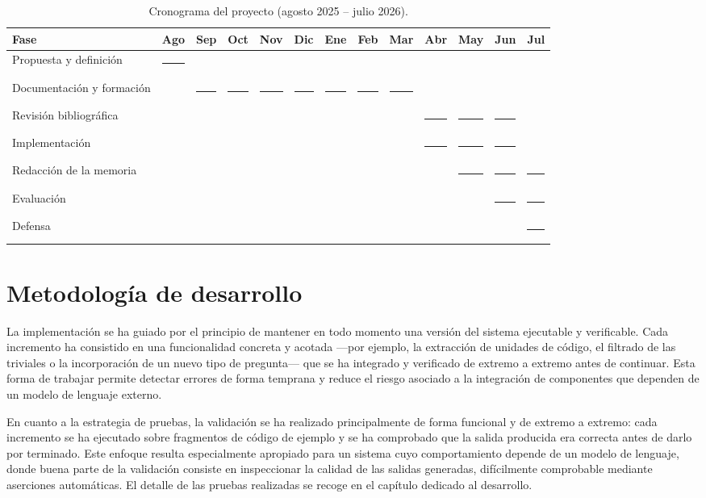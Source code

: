 \begin{table}[htbp]
  \centering
  \caption{Cronograma del proyecto (agosto 2025 -- julio 2026).}
  \label{tab:cronograma}
  \footnotesize
  \setlength{\tabcolsep}{4pt}
  \newcommand{\gx}{\rule[-0.2ex]{0.9em}{1.3ex}}
  \begin{tabular}{l *{12}{c}}
    \toprule
    Fase & Ago & Sep & Oct & Nov & Dic & Ene & Feb & Mar & Abr & May & Jun & Jul \\
    \midrule
    Propuesta y definición       & \gx &     &     &     &     &     &     &     &     &     &     &     \\
    Documentación y formación    &     & \gx & \gx & \gx & \gx & \gx & \gx & \gx &     &     &     &     \\
    Revisión bibliográfica       &     &     &     &     &     &     &     &     & \gx & \gx & \gx &     \\
    Implementación               &     &     &     &     &     &     &     &     & \gx & \gx & \gx &     \\
    Redacción de la memoria      &     &     &     &     &     &     &     &     &     & \gx & \gx & \gx \\
    Evaluación                   &     &     &     &     &     &     &     &     &     &     & \gx & \gx \\
    Defensa                      &     &     &     &     &     &     &     &     &     &     &     & \gx \\
    \bottomrule
  \end{tabular}
\end{table}


\section{Metodología de desarrollo}
\label{sec:metodologia-desarrollo}

La implementación se ha guiado por el principio de mantener en todo
momento una versión del sistema ejecutable y verificable. Cada
incremento ha consistido en una funcionalidad concreta y acotada ---por
ejemplo, la extracción de unidades de código, el filtrado de las
triviales o la incorporación de un nuevo tipo de pregunta--- que se ha
integrado y verificado de extremo a extremo antes de continuar. Esta
forma de trabajar permite detectar errores de forma temprana y reduce el
riesgo asociado a la integración de componentes que dependen de un
modelo de lenguaje externo.

En cuanto a la estrategia de pruebas, la validación se ha realizado
principalmente de forma funcional y de extremo a extremo: cada
incremento se ha ejecutado sobre fragmentos de código de ejemplo y se ha
comprobado que la salida producida era correcta antes de darlo por
terminado. Este enfoque resulta especialmente apropiado para un sistema
cuyo comportamiento depende de un modelo de lenguaje, donde buena parte
de la validación consiste en inspeccionar la calidad de las salidas
generadas, difícilmente comprobable mediante aserciones automáticas. El
detalle de las pruebas realizadas se recoge en el capítulo dedicado al
desarrollo.

